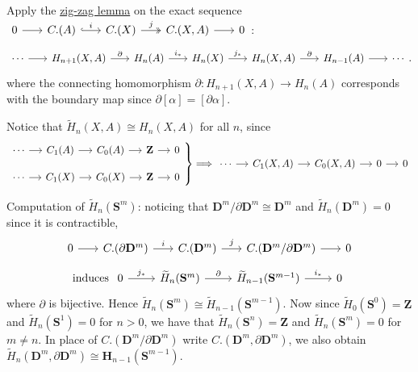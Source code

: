 \documentclass[11pt]{article}
\theoremstyle{definition}
\theoremstyle{plain}
\theoremstyle{remark}
\newenvironment{rcases}
  {\left.\begin{aligned}}
  {\end{aligned}\right\rbrace}
\newcommand{\Z}{\mathbf{Z}}
\begin{document}
Apply the \hyperref[zig-zag lemma]{zig-zag lemma} on the exact sequence $\begin{tikzcd}[column sep=scriptsize]
0\arrow{r}&C.(A)\arrow[hookrightarrow]{r}{i}&C.(X)\arrow[twoheadrightarrow]{r}{j}&C.(X,A)\arrow{r}&0
\end{tikzcd}$:
\[\begin{tikzcd}[column sep=scriptsize]
\cdots\arrow{r}&H_{n+1}(X,A)\arrow{r}{\partial}&H_n(A)\arrow{r}{i_\ast}&H_n(X)\arrow{r}{j_\ast}&H_n(X,A)\arrow{r}{\partial}&H_{n-1}(A)\arrow{r}&\cdots
\end{tikzcd}.\]
where the connecting homomorphism $\partial:H_{n+1}(X,A)\to H_n(A)$ corresponds with the boundary map since $\partial[\alpha]=[\partial\alpha]$.

Notice that $\widetilde{H}_n(X,A)\cong H_n(X,A)$ for all $n$, since
\[\begin{rcases}\begin{tikzcd}[column sep=small, row sep=small]
\cdots\arrow{r}&C_1(A)\arrow{r}&C_0(A)\arrow[r]&\Z\arrow[r]&0\\
\cdots\arrow{r}&C_1(X)\arrow{r}&C_0(X)\arrow[r]&\Z\arrow[r]&0
\end{tikzcd}\end{rcases}\Longrightarrow\begin{tikzcd}[column sep=small, row sep=small]
\cdots\arrow{r}&C_1(X,A)\arrow{r}&C_0(X,A)\arrow[r]&0\arrow[r]&0
\end{tikzcd}\]

Computation of $\widetilde{H}_n(\mathbf{S}^m)$: noticing that $\mathbf{D}^m/\partial\mathbf{D}^m\cong\mathbf{D}^m$ and $\widetilde{H}_n(\mathbf{D}^m)=0$ since it is contractible,
\[\begin{tikzcd}[column sep=scriptsize]
0\arrow[r]&C.(\partial\mathbf{D}^m)\arrow{r}{i}&C.(\mathbf{D}^m)\arrow{r}{j}&C.(\mathbf{D}^m/\partial\mathbf{D}^m)\arrow[r]&0
\end{tikzcd}\]
\[\textrm{induces }\begin{tikzcd}
0\arrow{r}{j_\ast}&\widetilde{H}_n(\mathbf{S}^m)\arrow{r}{\partial}&\widetilde{H}_{n-1}(\mathbf{S}^{m-1})\arrow{r}{i_\ast}&0
\end{tikzcd}\]
where $\partial$ is bijective. Hence $\widetilde{H}_n(\mathbf{S}^m)\cong\widetilde{H}_{n-1}(\mathbf{S}^{m-1})$. Now since $\widetilde{H}_0(\mathbf{S}^0)=\Z$ and $\widetilde{H}_n(\mathbf{S}^1)=0$ for $n>0$, we have that $\widetilde{H}_n(\mathbf{S}^n)=\Z$ and $\widetilde{H}_n(\mathbf{S}^m)=0$ for $m\neq n$. In place of $C.(\mathbf{D}^m/\partial\mathbf{D}^m)$ write $C.(\mathbf{D}^m,\partial\mathbf{D}^m)$, we also obtain $\widetilde{H}_n(\mathbf{D}^m,\partial\mathbf{D}^m)\cong\mathbf{H}_{n-1}(\mathbf{S}^{m-1})$.\medbreak
\end{document}
